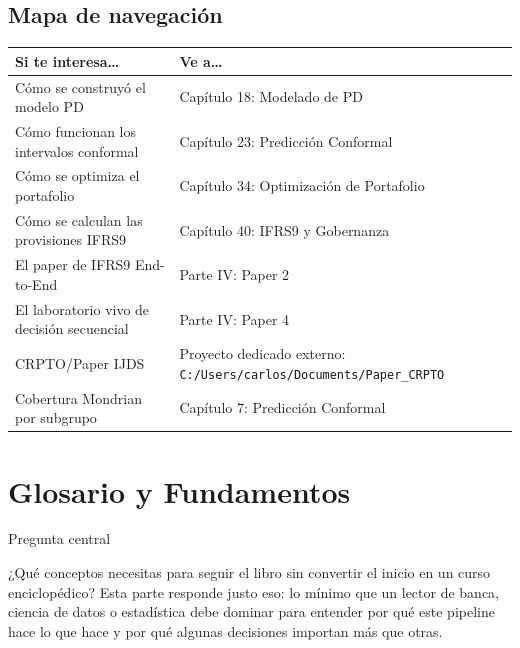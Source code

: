 \documentclass[
  spanish,
  11pt,
  letterpaper,
]{scrbook}
\newcounter{none} %
\theoremstyle{plain}
\theoremstyle{remark}
\begin{document}
\section{Mapa de navegación}\label{mapa-de-navegaciuxf3n}

{\def\LTcaptype{none} %
\begin{longtable}[]{@{}
  >{\raggedright\arraybackslash}p{}
  >{\raggedright\arraybackslash}p{}@{}}
\toprule\noalign{}
\begin{minipage}[b]{\linewidth}\raggedright
Si te interesa\ldots{}
\end{minipage} & \begin{minipage}[b]{\linewidth}\raggedright
Ve a\ldots{}
\end{minipage} \\
\midrule\noalign{}
\endhead
\bottomrule\noalign{}
\endlastfoot
Cómo se construyó el modelo PD & Capítulo 18: Modelado de PD \\
Cómo funcionan los intervalos conformal & Capítulo 23: Predicción
Conformal \\
Cómo se optimiza el portafolio & Capítulo 34: Optimización de
Portafolio \\
Cómo se calculan las provisiones IFRS9 & Capítulo 40: IFRS9 y
Gobernanza \\
El paper de IFRS9 End-to-End & Parte IV: Paper 2 \\
El laboratorio vivo de decisión secuencial & Parte IV: Paper 4 \\
CRPTO/Paper IJDS & Proyecto dedicado externo:
\texttt{C:/Users/carlos/Documents/Paper\_CRPTO} \\
Cobertura Mondrian por subgrupo & Capítulo 7: Predicción Conformal \\
\end{longtable}
}

\chapter{Glosario y Fundamentos}\label{glosario-y-fundamentos}

{Pregunta central}

¿Qué conceptos necesitas para seguir el libro sin convertir el inicio en
un curso enciclopédico? Esta parte responde justo eso: lo mínimo que un
lector de banca, ciencia de datos o estadística debe dominar para
entender por qué este pipeline hace lo que hace y por qué algunas
decisiones importan más que otras.
\end{document}
